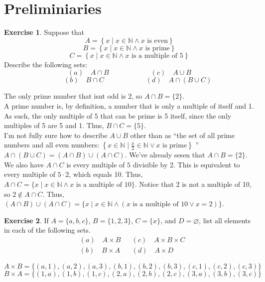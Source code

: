 \documentclass{article}
\theoremstyle{definition}
\newtheorem{environment}{Exercise}
\newenvironment{exercise}
    {\begin{mdframed}\begin{environment}}
    {\end{environment}\end{mdframed}}
\begin{document}
\section{Preliminiaries}
\begin{exercise}
    Suppose that
\[
    A=\left\{ x\mid x\in\mathbb{N} \land x\text{ is even}   \right\}
\]
\[
    B=\left\{ x\mid x\in\mathbb{N} \land x\text{ is prime}   \right\}
\]
\[
    C=\left\{ x\mid x\in\mathbb{N} \land x\text{ is a multiple of }5   \right\}
\]
Describe the following sets:
\[
    (a)\quad A\cap B \qquad \qquad\qquad (c)\quad A\cup B
\]
\[
    \hspace{1cm}(b)\quad B\cap C \qquad\qquad\qquad (d)\quad A \cap (B \cup  C)
\]
\end{exercise}
The only prime number that isnt odd is \(2\), so \(A\cap B = \{ 2 \} \).\\
A prime number is, by definition, a number that is only a multiple of itself and 1. As such, the only multiple of 5 that can be prime is 5 itself, since the only multiples of 5 are 5 and 1. Thus, \(B \cap  C = \{ 5 \} \).\\
I'm not fully sure how to describe \(A \cup  B\) other than as ``the set of all prime numbers and all even numbers: \(\left\{ x\in\mathbb{N} \mid \frac{x}{2}\in\mathbb{N} \lor x\text{ is prime}  \right\} \) ''\\
\(A \cap (B \cup  C) = (A \cap B) \cup  (A \cap  C)\). We've already sesen that \(A \cap B = \{ 2 \} \). We also have \(A \cap C\) is every multiple of \(5\) divisible by 2. This is equivalent to every multiple of \(5\cdot2\), which equals 10. Thus, \(A \cap C = \{ x\mid x\in\mathbb{N} \land x\text{ is a multiple of }10  \} \). Notice that \(2\) is not a multiple of 10, so \(2\notin A \cap  C\). Thus, \((A \cap  B)\cup (A\cap C)=\{ x\mid x\in\mathbb{N} \land (x\text{ is a multiple of 10}\lor x=2 ) \} \).\\
\begin{exercise}
    If \(A=\{ a,b,c \} \), \(B=\{ 1,2,3 \} \), \(C=\{ x \} \), and \(D=\varnothing \), list all elements in each of the following sets.
\begin{align*}
    &(a)\quad A\times B &&(c)\quad A\times B\times C\\
    &(b)\quad B\times A &&(d)\quad A\times D
\end{align*}
\end{exercise}
\[
    A\times B=\{ (a,1),(a,2),(a,3),(b,1),(b,2),(b,3),(c,1),(c,2),(c,3) \} 
\]
\[
    B\times A =\{ (1,a),(1,b),(1,c),(2,a),(2,b),(2,c),(3,a),(3,b),(3,c) \} 
\]
\end{document}
